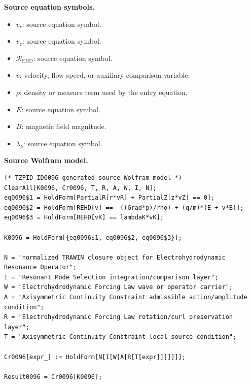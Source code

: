 \begin{minipage}[t]{0.49\linewidth}
\begingroup
\small
\raggedright
\textbf{Source equation symbols.}\par
\begin{itemize}[leftmargin=1.35em,itemsep=1pt,topsep=1pt,parsep=0pt]
    \item $v_r$: source equation symbol.
    \item $v_z$: source equation symbol.
    \item $\mathcal{R}_{\mathrm{EHD}}$: source equation symbol.
    \item $v$: velocity, flow speed, or auxiliary comparison variable.
    \item $\rho$: density or measure term used by the entry equation.
    \item $E$: source equation symbol.
    \item $B$: magnetic field magnitude.
    \item $\lambda_k$: source equation symbol.
\end{itemize}
\endgroup
\end{minipage}\hfill
\begin{minipage}[t]{0.47\linewidth}
\begingroup
\scriptsize
\raggedright
\textbf{Source Wolfram model.}\par
\begin{Verbatim}[fontsize=\tiny,breaklines=true,breakanywhere=true]
(* TZPID ID0096 generated source Wolfram model *)
ClearAll[K0096, Cr0096, T, R, A, W, I, N];
eq0096$1 = HoldForm[PartialR[r*vR] + PartialZ[z*vZ] == 0];
eq0096$2 = HoldForm[REHD[v] == -((Grad*p)/rho) + (q/m)*(E + v*B)];
eq0096$3 = HoldForm[REHD[vK] == lambdaK*vK];

K0096 = HoldForm[{eq0096$1, eq0096$2, eq0096$3}];

N = "normalized TRAWIN closure object for Electrohydrodynamic Resonance Operator";
I = "Resonant Mode Selection integration/comparison layer";
W = "Electrohydrodynamic Forcing Law wave or operator carrier";
A = "Axisymmetric Continuity Constraint admissible action/amplitude condition";
R = "Electrohydrodynamic Forcing Law rotation/curl preservation layer";
T = "Axisymmetric Continuity Constraint local source condition";

Cr0096[expr_] := HoldForm[N[I[W[A[R[T[expr]]]]]]];

Result0096 = Cr0096[K0096];
\end{Verbatim}
\endgroup
\end{minipage}

